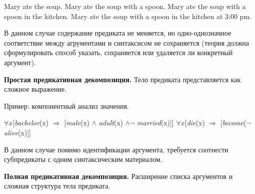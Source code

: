 \documentclass[10pt]{article}
\theoremstyle{example-style}
\begin{document}
\begin{exe}
\ex 
  \begin{xlist}
    \ex Mary ate the soup.
    \ex Mary ate the soup with a spoon.
    \ex Mary ate the soup with a spoon in the kitchen.
    \ex Mary ate the soup with a spoon in the kitchen at 3:00 pm.
  \end{xlist}
\ex 
  \begin{xlist}
  \end{xlist}
\end{exe}

В данном случае содержание предиката не меняется, но одно-однозначное соответствие между агрументами и синтаксисом не сохраняется (теория должна сформулировать способ указать, сохраняется или удаляется ли конкретный аргумент).

\textbf{Простая предикативная декомпозиция.} Тело предиката представляется как сложное выражение.

\begin{exe}
\end{exe}

Пример: компонентный анализ значения.

\begin{exe}
  \ex $\forall x$[\textit{bachelor}(x) $\Rightarrow$ [\textit{male}(x) $\wedge$ \textit{adult}(x) $\wedge \neg$ \textit{married}(x)]]  
  \ex $\forall x$[\textit{die}(x) $\Rightarrow$ [\textit{become}($\neg$ \textit{alive}(x)]]
\end{exe}

В данном случае помимо идентификации аргумента, требуется соотнести субпредикаты с одним синтаксическим материалом.

\textbf{Полная предикативная декомпозиция.} Расширение списка аргументов и сложная структура тела предиката.

\begin{exe}
\end{exe}
\end{document}
